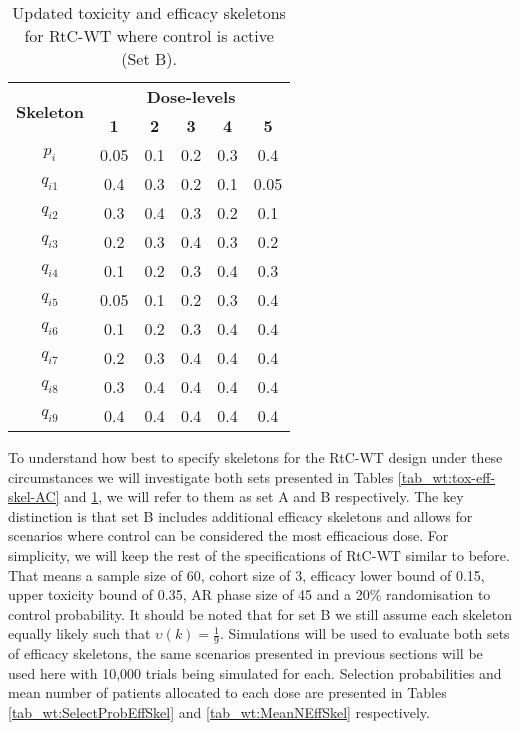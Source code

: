    \begin{table}[!h]
 	\centering
 	\caption[Updated toxicity and efficacy skeletons for RtC-WT (Set B)]{Updated toxicity and efficacy skeletons for RtC-WT where control is active (Set B).}
 	\label{tab_wt:tox-eff-skel-ACadditional}
 	\begin{tabular}{c|ccccc}
 		\hline
 		\multicolumn{1}{c|}{\multirow{2}{*}{\textbf{Skeleton}}} & \multicolumn{5}{c}{\textbf{Dose-levels}}                       \\
 		\multicolumn{1}{c|}{}                                   & \textbf{1} & \textbf{2} & \textbf{3} & \textbf{4} & \textbf{5} \\ \hline
 		$p_i$    & 0.05 & 0.1 & 0.2 & 0.3 & 0.4 \\
 		$q_{i1}$ & 0.4 & 0.3 & 0.2 & 0.1 & 0.05 \\
 		$q_{i2}$ & 0.3 & 0.4 & 0.3 & 0.2 & 0.1 \\
 		$q_{i3}$ & 0.2 & 0.3 & 0.4 & 0.3 & 0.2 \\
 		$q_{i4}$ & 0.1 & 0.2 & 0.3 & 0.4 & 0.3 \\
 		$q_{i5}$ & 0.05 & 0.1 & 0.2 & 0.3 & 0.4 \\
 		$q_{i6}$ & 0.1 & 0.2 & 0.3 & 0.4 & 0.4 \\
 		$q_{i7}$ & 0.2 & 0.3 & 0.4 & 0.4 & 0.4 \\
 		$q_{i8}$ & 0.3 & 0.4 & 0.4 & 0.4 & 0.4 \\
 		$q_{i9}$ & 0.4 & 0.4 & 0.4 & 0.4 & 0.4 \\ \hline
 	\end{tabular}
 \end{table}
 
To understand how best to specify skeletons for the RtC-WT design under these circumstances we will investigate both sets presented in Tables \ref{tab_wt:tox-eff-skel-AC} and \ref{tab_wt:tox-eff-skel-ACadditional}, we will refer to them as set A and B respectively. The key distinction is that set B includes additional efficacy skeletons and allows for scenarios where control can be considered the most efficacious dose. For simplicity, we will keep the rest of the specifications of RtC-WT similar to before. That means a sample size of 60, cohort size of 3, efficacy lower bound of 0.15, upper toxicity bound of 0.35, AR phase size of 45 and a 20\% randomisation to control probability. It should be noted that for set B we still assume each skeleton equally likely such that $\upsilon(k) = \frac{1}{9}$. Simulations will be used to evaluate both sets of efficacy skeletons, the same scenarios presented in previous sections will be used here with 10,000 trials being simulated for each. Selection probabilities and mean number of patients allocated to each dose are presented in Tables \ref{tab_wt:SelectProbEffSkel} and \ref{tab_wt:MeanNEffSkel} respectively. 

